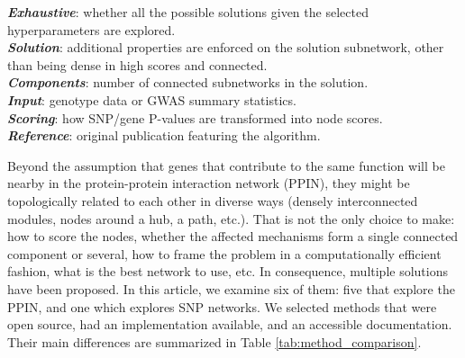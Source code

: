 \documentclass[twocolumn, 10pt]{article}
\begin{document}
\begin{table}[htbp]
\begin{threeparttable}
\begin{tablenotes}
      \textbf{\emph{Exhaustive}}: whether all the possible solutions given the selected hyperparameters are explored.\\
      \textbf{\emph{Solution}}: additional properties are enforced on the solution subnetwork, other than being dense in high scores and connected.\\
      \textbf{\emph{Components}}: number of connected subnetworks in the solution.\\
      \textbf{\emph{Input}}: genotype data or GWAS summary statistics.\\
      \textbf{\emph{Scoring}}: how SNP/gene P-values are transformed into node scores.\\
      \textbf{\emph{Reference}}: original publication featuring the algorithm.
    \end{tablenotes}
  \end{threeparttable}
\end{table}

Beyond the assumption that genes that contribute to the same function will be nearby in the protein-protein interaction network (PPIN), they might be topologically related to each other in diverse ways (densely interconnected modules, nodes around a hub, a path, etc.). That is not the only choice to make: how to score the nodes, whether the affected mechanisms form a single connected component or several, how to frame the problem in a computationally efficient fashion, what is the best network to use, etc. In consequence, multiple solutions have been proposed. In this article, we examine six of them: five that explore the PPIN, and one which explores SNP networks. We selected methods that were open source, had an implementation available, and an accessible documentation. Their main differences are summarized in Table \ref{tab:method_comparison}.
\end{document}
